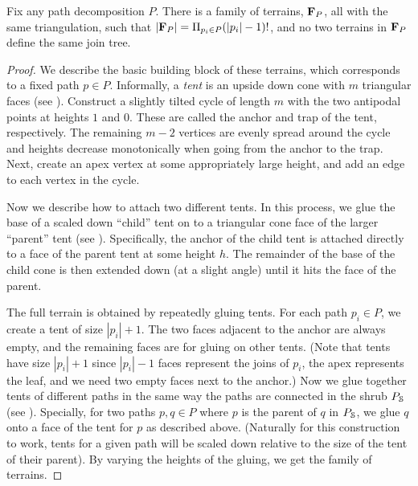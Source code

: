 {\begin{lemma}
\label{lem:pathDecomp}
Fix any path decomposition $P$. There is a family of terrains, ${\bf F}_P$, all with the same triangulation, 
such that $|{\bf F}_P| = \Pi_{p_i\in P} (|p_i|-1)!$, and no two terrains in ${\bf F}_P$ define the same join tree.
\end{lemma}


\begin{proof}
 
 We describe the basic building block of these terrains, which corresponds to a fixed path $p\in P$.  
 Informally, a \emph{tent} is an upside down cone with $m$ triangular faces (see ). 
 Construct a slightly tilted cycle 
 of length $m$ with the two antipodal points at heights $1$ and $0$. These are called the anchor and trap of the tent, respectively.
 The remaining $m-2$ vertices are evenly spread around the cycle and heights decrease monotonically when going from the anchor to the trap.
 Next, create an apex vertex at some appropriately large height, and add an edge to each vertex in the cycle. 


 Now we describe how to attach two different tents.  In this process, we glue the base of a scaled down ``child'' tent on to a triangular cone face of the larger  ``parent'' tent (see ).
 Specifically, the anchor of the child tent is attached directly to a face of the parent tent at some height $h$. The remainder of the base of the child cone is then 
 extended down (at a slight angle) until it hits the face of the parent.
 
 The full terrain is obtained by repeatedly gluing tents. For each path $p_i\in P$, we create a tent of size $|p_i|+1$.
 The two faces adjacent to the anchor are always empty, and the remaining faces are for gluing on other tents.
 (Note that tents have size $|p_i|+1$ since $|p_i|-1$ faces represent the joins of $p_i$, the apex represents the leaf, 
 and we need two empty faces next to the anchor.)
 Now we glue together tents of different paths in the same way the paths are connected in the shrub $P_{\mathcal{S}}$ (see ).  
 Specially, for two paths $p,q\in P$ where 
 $p$ is the parent of $q$ in $P_{\mathcal{S}}$, we glue $q$ onto a face of the tent for $p$ as described above.
 (Naturally for this construction to work, tents for a given path will be scaled down relative to the size of the tent of their parent).
 By varying the heights of the gluing, we get the family of terrains.
 

\end{proof}}

